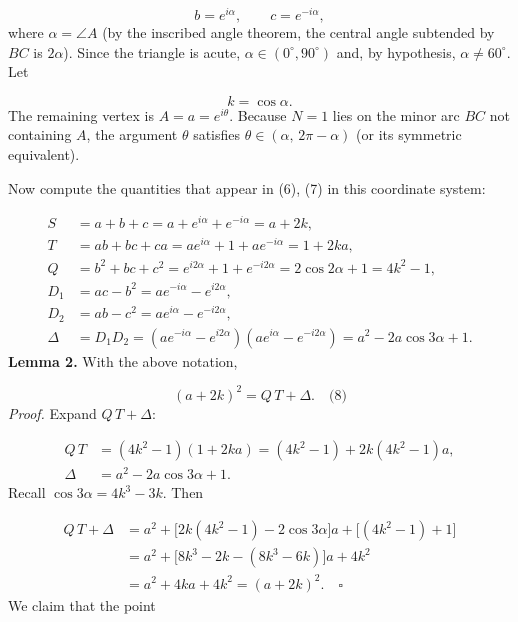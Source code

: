 \[
b = e^{i\alpha},\qquad c = e^{-i\alpha},
\]
where \(\alpha = \angle A\) (by the inscribed angle theorem, the central angle subtended by \(BC\) is \(2\alpha\)). Since the triangle is acute, \(\alpha \in (0^\circ,90^\circ)\) and, by hypothesis, \(\alpha \neq 60^\circ\). Let\par
\[
k = \cos\alpha.
\]
The remaining vertex is \(A = a = e^{i\theta}\). Because \(N = 1\) lies on the minor arc \(BC\) not containing \(A\), the argument \(\theta\) satisfies \(\theta \in (\alpha,\, 2\pi-\alpha)\) (or its symmetric equivalent).\par
Now compute the quantities that appear in (6), (7) in this coordinate system:\par
\[
\begin{aligned}
S &= a + b + c = a + e^{i\alpha} + e^{-i\alpha} = a + 2k, \\[2mm]
T &= ab + bc + ca = a e^{i\alpha} + 1 + a e^{-i\alpha} = 1 + 2k a, \\[2mm]
Q &= b^2 + bc + c^2 = e^{i2\alpha} + 1 + e^{-i2\alpha} = 2\cos 2\alpha + 1 = 4k^2 - 1, \\[2mm]
D_1 &= ac - b^2 = a e^{-i\alpha} - e^{i2\alpha}, \\[2mm]
D_2 &= ab - c^2 = a e^{i\alpha} - e^{-i2\alpha}, \\[2mm]
\Delta &= D_1 D_2 = (a e^{-i\alpha} - e^{i2\alpha})(a e^{i\alpha} - e^{-i2\alpha}) = a^2 - 2a\cos 3\alpha + 1.
\end{aligned}
\]
\smallskip
{}
\textbf{Lemma 2.} With the above notation,\par
\[
(a + 2k)^2 = Q\,T + \Delta. \quad\text{(8)}
\]
\emph{Proof.} Expand \(Q\,T + \Delta\):\par
\[
\begin{aligned}
Q\,T &= (4k^2-1)(1+2k a) = (4k^2-1) + 2k(4k^2-1)a, \\[2mm]
\Delta &= a^2 - 2a\cos 3\alpha + 1.
\end{aligned}
\]
Recall \(\cos 3\alpha = 4k^3 - 3k\). Then\par
\[
\begin{aligned}
Q\,T + \Delta &= a^2 + \bigl[2k(4k^2-1) - 2\cos 3\alpha\bigr] a + \bigl[(4k^2-1)+1\bigr] \\
&= a^2 + \bigl[8k^3 - 2k - (8k^3 - 6k)\bigr] a + 4k^2 \\
&= a^2 + 4k a + 4k^2 = (a+2k)^2. \quad\square
\end{aligned}
\]
\smallskip
{}
We claim that the point\par
